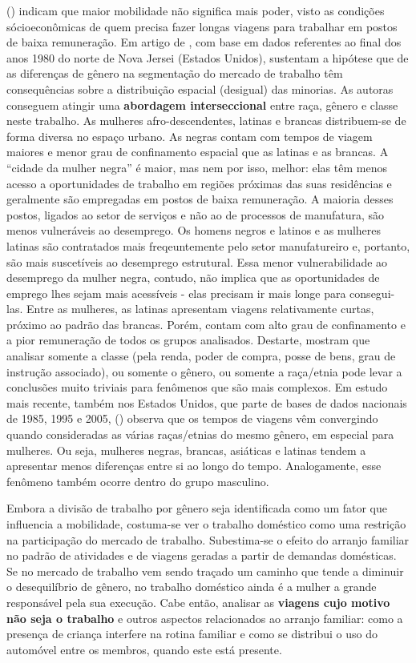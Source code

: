  (\citeyear{LAFFERTY1991}) indicam que maior mobilidade não significa mais poder, visto as condições sócioeconômicas de quem precisa fazer longas viagens para trabalhar em postos de baixa remuneração. Em artigo de \citeyear{LAFFERTY1992}, com base em dados referentes ao final dos anos 1980 do norte de Nova Jersei (Estados Unidos),  sustentam a hipótese que de as diferenças de gênero na segmentação do mercado de trabalho têm consequências sobre a distribuição espacial (desigual) das minorias. As autoras conseguem atingir uma \textbf{abordagem interseccional} entre raça, gênero e classe neste trabalho. As mulheres afro-descendentes, latinas e brancas distribuem-se de forma diversa no espaço urbano. As negras contam com tempos de viagem maiores e menor grau de confinamento espacial que as latinas e as brancas. A ``cidade da mulher negra'' é maior, mas nem por isso, melhor: elas têm menos acesso a oportunidades de trabalho em regiões próximas das suas residências e geralmente são empregadas em postos de baixa remuneração. A maioria desses postos, ligados ao setor de serviços e não ao de processos de manufatura, são menos vulneráveis ao desemprego. Os homens negros e latinos e as mulheres latinas são contratados mais freqeuntemente pelo setor manufatureiro e, portanto, são mais suscetíveis ao desemprego estrutural. Essa menor vulnerabilidade ao desemprego da mulher negra, contudo, não implica que as oportunidades de emprego lhes sejam mais acessíveis - elas precisam ir mais longe para consegui-las. Entre as mulheres, as latinas apresentam viagens relativamente curtas, próximo ao padrão das brancas. Porém, contam com alto grau de confinamento e a pior remuneração de todos os grupos analisados. Destarte,  mostram que analisar somente a classe (pela renda, poder de compra, posse de bens, grau de instrução associado), ou somente o gênero, ou somente a raça/etnia pode levar a conclusões muito triviais para fenômenos que são mais complexos. Em estudo mais recente, também nos Estados Unidos, que parte de bases de dados nacionais de 1985, 1995 e 2005,  (\citeyear{CRANE2007}) observa que os tempos de viagens vêm convergindo quando consideradas as várias raças/etnias do mesmo gênero, em especial para mulheres. Ou seja, mulheres negras, brancas, asiáticas e latinas tendem a apresentar menos diferenças entre si ao longo do tempo. Analogamente, esse fenômeno também ocorre dentro do grupo masculino.


Embora a divisão de trabalho por gênero seja identificada como um fator que influencia a mobilidade, costuma-se ver o trabalho doméstico como uma restrição na participação do mercado de trabalho.
Subestima-se o efeito do arranjo familiar no padrão de atividades e de viagens geradas a partir de demandas domésticas.
Se no mercado de trabalho vem sendo traçado um caminho que tende a diminuir o desequilíbrio de gênero, no trabalho doméstico ainda é a mulher a grande responsável pela sua execução.
Cabe então, analisar as \textbf{viagens cujo motivo não seja o trabalho} e outros aspectos relacionados ao arranjo familiar: como a presença de criança interfere na rotina familiar e como se distribui o uso do automóvel entre os membros, quando este está presente.


